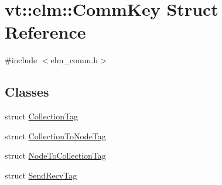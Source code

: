 \hypertarget{structvt_1_1elm_1_1_comm_key}{}\section{vt\+:\+:elm\+:\+:Comm\+Key Struct Reference}
\label{structvt_1_1elm_1_1_comm_key}


{\ttfamily \#include $<$elm\+\_\+comm.\+h$>$}

\subsection*{Classes}
\begin{DoxyCompactItemize}
\item 
struct \hyperlink{structvt_1_1elm_1_1_comm_key_1_1_collection_tag}{Collection\+Tag}
\item 
struct \hyperlink{structvt_1_1elm_1_1_comm_key_1_1_collection_to_node_tag}{Collection\+To\+Node\+Tag}
\item 
struct \hyperlink{structvt_1_1elm_1_1_comm_key_1_1_node_to_collection_tag}{Node\+To\+Collection\+Tag}
\item 
struct \hyperlink{structvt_1_1elm_1_1_comm_key_1_1_send_recv_tag}{Send\+Recv\+Tag}
\end{DoxyCompactItemize}
